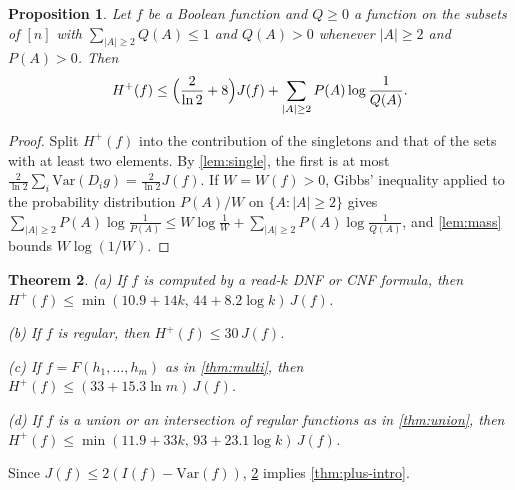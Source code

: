 \documentclass[11pt]{amsart}
\newtheorem{theorem}{Theorem}[section]
\newtheorem{proposition}[theorem]{Proposition}
\theoremstyle{definition}
\theoremstyle{remark}
\newcommand{\Var}{\mathrm{Var}}
\begin{document}
\begin{proposition}\label{prop:reduce}
Let $f$ be a Boolean function and $Q\ge0$ a function on the subsets of $[n]$ with $\sum_{|A|\ge2}Q(A)\le1$ and
$Q(A)>0$ whenever $|A|\ge2$ and $P(A)>0$. Then
\[
H^+(f)\le\Bigl(\frac2{\ln2}+8\Bigr)J(f)+\sum_{|A|\ge2}P(A)\log\frac1{Q(A)} .
\]
\end{proposition}

\begin{proof}
Split $H^+(f)$ into the contribution of the singletons and that of the sets with at least two elements. By
\cref{lem:single}, the first is at most $\frac2{\ln2}\sum_i\Var(D_ig)=\frac2{\ln2}J(f)$. If $W=W(f)>0$, Gibbs'
inequality applied to the probability distribution $P(A)/W$ on $\{A:|A|\ge2\}$ gives
$\sum_{|A|\ge2}P(A)\log\frac1{P(A)}\le W\log\frac1W+\sum_{|A|\ge2}P(A)\log\frac1{Q(A)}$, and \cref{lem:mass} bounds
$W\log(1/W)$.
\end{proof}

\begin{theorem}\label{thm:plus}
\textup{(a)} If $f$ is computed by a read-$k$ DNF or CNF formula, then $H^+(f)\le\min(10.9+14k,\,44+8.2\log k)\,J(f)$.

\noindent\textup{(b)} If $f$ is regular, then $H^+(f)\le30\,J(f)$.

\noindent\textup{(c)} If $f=F(h_1,\dots,h_m)$ as in \cref{thm:multi}, then $H^+(f)\le(33+15.3\ln m)\,J(f)$.

\noindent\textup{(d)} If $f$ is a union or an intersection of regular functions as in \cref{thm:union}, then
$H^+(f)\le\min(11.9+33k,\,93+23.1\log k)\,J(f)$.
\end{theorem}

Since $J(f)\le2(I(f)-\Var(f))$, \cref{thm:plus} implies \cref{thm:plus-intro}.
\end{document}
